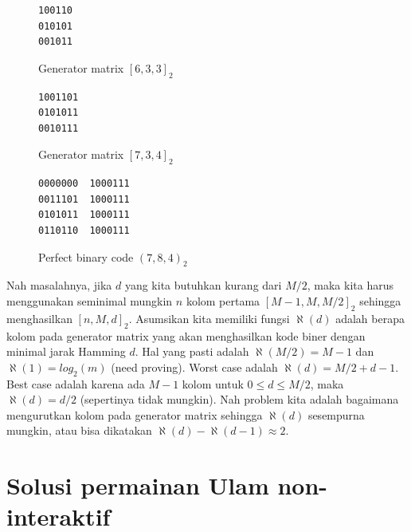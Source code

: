 \documentclass[conference,compsoc]{IEEEtran}
\begin{document}
\begin{figure}
\centering
\begin{BVerbatim}
100110
010101
001011
\end{BVerbatim}
\caption{Generator matrix $[6,3,3]_2$}
\label{fig:generator633}
\end{figure}

\begin{figure}
\centering
\begin{BVerbatim}
1001101
0101011
0010111
\end{BVerbatim}
\caption{Generator matrix $[7,3,4]_2$}
\label{fig:generator734}
\end{figure}

\begin{figure}
\centering
\begin{BVerbatim}
0000000  1000111
0011101  1000111
0101011  1000111
0110110  1000111
\end{BVerbatim}
\caption{Perfect binary code $(7,8,4)_2$}
\label{fig:binarycode784}
\end{figure}

Nah masalahnya, jika $d$ yang kita butuhkan kurang dari $M/2$, maka kita harus menggunakan seminimal mungkin $n$ kolom pertama $[M-1,M,M/2]_2$ sehingga menghasilkan $[n,M,d]_2$. Asumsikan kita memiliki fungsi $\aleph(d)$ adalah berapa kolom pada generator matrix yang akan menghasilkan kode biner dengan minimal jarak Hamming $d$. Hal yang pasti adalah $\aleph(M/2) = M-1$ dan $\aleph(1) = {log}_2(m)$ (need proving). Worst case adalah $\aleph(d)=M/2 + d - 1$. Best case adalah karena ada $M-1$ kolom untuk $0 \leq d \leq M/2$, maka $\aleph(d) = d/2$ (sepertinya tidak mungkin). Nah problem kita adalah bagaimana mengurutkan kolom pada generator matrix sehingga $\aleph(d)$ sesempurna mungkin, atau bisa dikatakan $\aleph(d) - \aleph(d-1) \approx 2$.




\section{Solusi permainan Ulam non-interaktif}
\end{document}
